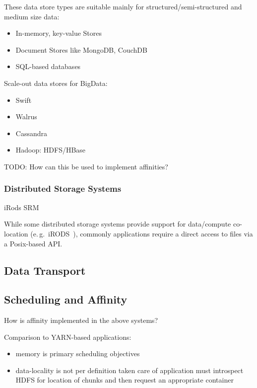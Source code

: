 \documentclass[conference]{IEEEtran}
\begin{document}
These data store types are suitable mainly for structured/semi-structured and 
medium size data:
\begin{itemize}
	\item In-memory, key-value Stores
	\item Document Stores like MongoDB, CouchDB 
	\item SQL-based databases
\end{itemize}

Scale-out data stores for BigData:
\begin{itemize}
	\item Swift
	\item Walrus
	\item Cassandra
	\item Hadoop: HDFS/HBase
\end{itemize}

TODO: How can this be used to implement affinities?


\subsubsection*{Distributed Storage Systems}

iRods
SRM

While some distributed storage systems provide support for data/compute 
co-location (e.\,g.\ iRODS~\cite{Rajasekar:2010:IPI:1855046}), commonly 
applications require a direct access to files via a Posix-based API.

\subsection{Data Transport}

\subsection{Scheduling and Affinity}

How is affinity implemented in the above systems?

Comparison to YARN-based applications:
\begin{itemize}
	\item memory is primary scheduling objectives
	\item data-locality is not per definition taken care of application must 
	introspect HDFS for location of chunks and then request an appropriate 
	container
\end{itemize}

\end{document}
